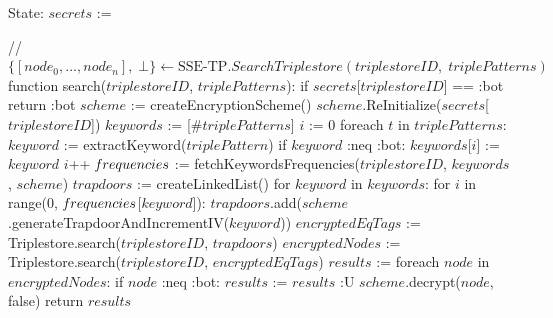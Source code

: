 State:
    $secrets$ := {}

// $\{[node_0, ..., node_n], \; \bot\} \leftarrow \textrm{SSE-TP}.SearchTriplestore(triplestoreID, \; triplePatterns)$
function search($triplestoreID$, $triplePatterns$):
    if $secrets$[$triplestoreID$] == :bot
        return :bot
    $scheme$ := createEncryptionScheme()
    $scheme$.ReInitialize($secrets$[$triplestoreID$])
    $keywords$ := [$\#triplePatterns$]
    $i$ := 0
    foreach $t$ in $triplePatterns$:
        $keyword$ := extractKeyword($triplePattern$) 
        if $keyword$ :neq :bot:
            $keywords$[$i$] := $keyword$
            $i$++
    $\textrm{\emph{f}}requencies$ := fetchKeywordsFrequencies($triplestoreID$, $keywords$, $scheme$)
    $trapdoors$ := createLinkedList()
    for $keyword$ in $keywords$:
        for $i$ in range(0, $\textrm{\emph{f}}requencies$[$keyword$]):
            $trapdoors$.add($scheme$.generateTrapdoorAndIncrementIV($keyword$))
    $encryptedEqTags$ := Triplestore.search($triplestoreID$, $trapdoors$)
    $encryptedNodes$ := Triplestore.search($triplestoreID$, $encryptedEqTags$)
    $results$ := {}
    foreach $node$ in $encryptedNodes$:
        if $node$ :neq :bot:
            $results$ := $results$ :U { $scheme$.decrypt($node$, false) }
    return $results$